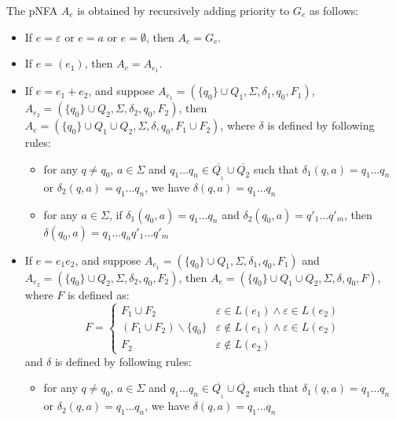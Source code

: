 \documentclass[sigplan,review,anonymous]{acmart}\settopmatter{printfolios=true,printccs=false,printacmref=false}
\begin{document}
The pNFA $A_e$ is obtained by recursively adding priority to $G_e$ as follows:
\begin{itemize}
  \item If $e = \varepsilon$ or $e = a$ or $e = \emptyset$, then $A_e = G_e$.
  
  \item If $e = (e_1)$, then $A_e = A_{e_1}$.
  
  \item If $e = e_1 + e_2$, and suppose $A_{e_1} = (\{ q_0 \} \cup Q_1,
  \Sigma, \delta_1, q_0, F_1)$, $A_{e_2} = (\{ q_0 \} \cup Q_2, \Sigma,
  \delta_2, q_0, F_2)$, then $A_e = (\{ q_0 \} \cup Q_1 \cup Q_2, \Sigma,
  \delta, q_0, F_1 \cup F_2)$, where $\delta$ is defined by following rules:
  \begin{itemize}
    \item for any $q \neq q_0$, $a \in \Sigma$ and $q_1 \ldots q_n \in
    \overline{Q_{_1}} \cup \overline{Q_2}$ such that $\delta_1 (q, a) = q_1
    \ldots q_n$ or $\delta_2 (q, a) = q_1 \ldots q_n$, we have $\delta (q, a)
    = q_1 \ldots q_n$
    
    \item for any $a \in \Sigma$, if $\delta_1 (q_0, a) = q_1 \ldots q_n$ and
    $\delta_2 (q_0, a) = q'_1 \ldots q'_m$, then $\delta (q_0, a) = q_1 \ldots
    q_n q'_1 \ldots q'_m$
  \end{itemize}
  \item If $e = e_1 e_2$, and suppose $A_{e_1} = (\{ q_0 \} \cup Q_1, \Sigma,
  \delta_1, q_0, F_1)$ and $A_{e_2} = (\{ q_0 \} \cup Q_2, \Sigma, \delta_2,
  q_0, F_2)$, then $A_e = (\{ q_0 \} \cup Q_1 \cup Q_2, \Sigma, \delta, q_0,
  F)$, where $F$ is defined as:
  \[ F = \left\{ \begin{array}{ll}
       F_1 \cup F_2 & \varepsilon \in L (e_1) \wedge \varepsilon \in L (e_2)\\
       (F_1 \cup F_2) \backslash \{ q_0 \} & \varepsilon \nin L (e_1) \wedge
       \varepsilon \in L (e_2)\\
       F_2 & \varepsilon \nin L (e_2)
     \end{array} \right. \]
  and $\delta$ is defined by following rules:
  \begin{itemize}
    \item for any $q \neq q_0$, $a \in \Sigma$ and $q_1 \ldots q_n \in
    \overline{Q_{_1}} \cup \overline{Q_2}$ such that $\delta_1 (q, a) = q_1
    \ldots q_n$ or $\delta_2 (q, a) = q_1 \ldots q_n$, we have $\delta (q, a)
    = q_1 \ldots q_n$
    

\end{itemize}
\end{itemize}
\end{document}
